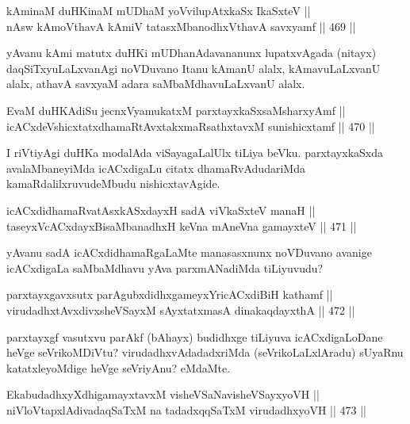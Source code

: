 \begin{shl}
kAminaM duHKinaM mUDhaM yoV\s vilupAtxkaSx IkaSxteV || \\
nAsw kAmoV\s thavA kAmiV tatasxMbanodhxV\s thavA savxyamf \hfill || 469 ||  
\end{shl}

\begin{artha}
yAvanu kAmi matutx duHKi mUDhanAdavananunx lupatxvAgada (nitayx)
daqSiTxyuLaLxvanAgi noVDuvano Itanu kAmanU alalx, kAmavuLaLxvanU
alalx, athavA savxyaM adara saMbaMdhavuLaLxvanU alalx.
\end{artha}

\begin{shl}
EvaM duHKAdiSu jecnxVyamukatxM parxtayxkaSxsaMsharxyAmf || \\
icACxdeVshicxtatxdhamaRtAvxtakxmaRsathxtavxM sunishicxtamf \hfill || 470 ||  
\end{shl}

\begin{artha}
I riVtiyAgi duHKa modalAda viSayagaLalUlx tiLiya beVku. parxtayxkaSxda
avalaMbaneyiMda icACxdigaLu citatx dhamaRvAdudariMda
kamaRdalilxruvudeMbudu nishicxtavAgide.
\end{artha}

\begin{shl}
icACxdidhamaRvatAsxkASxdayxH sadA viVkaSxteV manaH || \\
taseyxVcACxdayxBisaMbanadhxH keVna mAneVna gamayxteV \hfill || 471 ||  
\end{shl}

\begin{artha}
yAvanu sadA icACxdidhamaRgaLaMte manasasxnunx noVDuvano avanige
icACxdigaLa saMbaMdhavu yAva parxmANadiMda tiLiyuvudu?
\end{artha}

\begin{shl}
parxtayxgavxsutx parAgubxdidhxgameyxYricACxdiBiH kathamf || \\
virudadhxtAvxdivxsheVSayxM sAyxtatxmasA dinakaqdayxthA \hfill || 472 ||  
\end{shl}

\begin{artha}
parxtayxgf vasutxvu parAkf (bAhayx) budidhxge tiLiyuva icACxdigaLoDane
heVge seVrikoMDiVtu? virudadhxvAdadadxriMda (seVrikoLaLxlAradu)
sUyaRnu katatxleyoMdige heVge seVriyAnu? eMdaMte.
\end{artha}

\begin{shl}
EkabudadhxyXdhigamayxtavxM visheVSaNavisheVSayxyoVH || \\
niVloVtapxlAdivadaqSaTxM na tadadxqqSaTxM virudadhxyoVH \hfill || 473 ||  
\end{shl}


